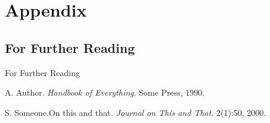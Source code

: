 \documentclass[english]{beamer}
\begin{document}
\appendix

\section*{Appendix}

\subsection*{For Further Reading}
\begin{frame}[allowframebreaks]{For Further Reading}

\beamertemplatebookbibitems
\begin{thebibliography}{1}
A. Author. \newblock\emph{Handbook of Everything}.\newblock
Some Press, 1990.\beamertemplatearticlebibitems

S. Someone.\newblock On this and that\emph{.}
\newblock\emph{Journal on This and That}. 2(1):50,
2000.
\end{thebibliography}
\end{frame}
\end{document}

